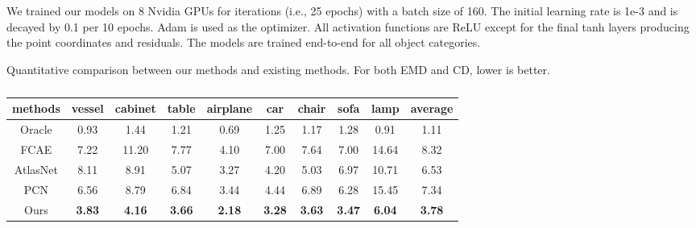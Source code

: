 \documentclass[letterpaper]{article} \usepackage{aaai20}  \usepackage{times}  \usepackage{helvet} \usepackage{courier}  \usepackage[hyphens]{url}  \usepackage{graphicx} \urlstyle{rm} \def\UrlFont{\rm}  \usepackage{graphicx}  \frenchspacing  \setlength{\pdfpagewidth}{8.5in}  \setlength{\pdfpageheight}{11in}  \usepackage{amsmath}
\begin{document}
We trained our models on 8 Nvidia GPUs for  iterations (i.e., 25 epochs) with a batch size of 160. The initial learning rate is 1e-3 and is decayed by 0.1 per 10 epochs. Adam is used as the optimizer. All activation functions are ReLU except for the final tanh layers producing the point coordinates and residuals. The models are trained end-to-end for all object categories.

\begin{table}[t] 
\caption{Quantitative comparison between our methods and existing methods. For both EMD and CD, lower is better.}  
\small
\begin{subtable}{\linewidth}
\centering
 \setlength{\tabcolsep}{1.5pt}
    \begin{tabular}{c|cccccccc|c}
    \hline
    {\small methods}    & {\scriptsize vessel} & {\scriptsize cabinet} & {\scriptsize table} & {\scriptsize airplane} & {\scriptsize car} & {\scriptsize chair} & {\scriptsize sofa} & {\scriptsize lamp} & {\small average} \\
    \hline
    {\small Oracle} & 0.93  & 1.44  & 1.21  & 0.69  & 1.25  & 1.17  & 1.28  & 0.91  & 1.11  \\
    \hline
    {\small FCAE}  & 7.22 &  11.20 &   7.77 &  4.10 &  7.00 &  7.64 &  7.00 &  14.64 &   8.32   \\
    {\small AtlasNet} & 8.11  & 8.91  & 5.07  & 3.27  & 4.20  & 5.03  & 6.97  & 10.71  & 6.53  \\
    {\small PCN}   & 6.56  & 8.79  & 6.84  & 3.44  & 4.44  & 6.89  & 6.28  & 15.45  & 7.34  \\
    {\small Ours}  & \textbf{3.83} & \textbf{4.16} & \textbf{3.66} & \textbf{2.18} & \textbf{3.28} & \textbf{3.63} & \textbf{3.47} & \textbf{6.04} & \textbf{3.78} \\
    \hline
    \end{tabular}\caption{}
\end{subtable}


\end{table}
\end{document}
